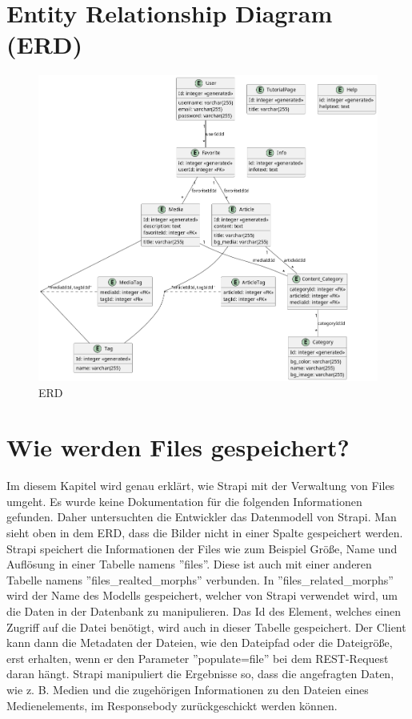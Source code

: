 \section{\textbf{E}ntity \textbf{R}elationship \textbf{D}iagram (ERD)}

\begin{figure}[H]
  \centering
  \includegraphics[height=1\textwidth]{./pics/erd.png}
  \caption{ERD}

\end{figure}

\section{Wie werden Files gespeichert?}
Im diesem Kapitel wird genau erklärt, wie Strapi mit der Verwaltung von Files umgeht. Es wurde keine Dokumentation für
die folgenden Informationen gefunden. Daher untersuchten die Entwickler das Datenmodell von  Strapi.
Man sieht oben in dem ERD,
dass die Bilder nicht in einer Spalte gespeichert werden. Strapi speichert die Informationen der Files wie zum
Beispiel Größe, Name und Auflösung in einer Tabelle namens ''files''.
Diese ist auch mit einer anderen Tabelle namens ''files\_realted\_morphs'' verbunden. In ''files\_related\_morphs'' wird
der Name des Modells gespeichert, welcher von Strapi verwendet wird, um die Daten in der Datenbank zu manipulieren. Das
Id des Element, welches einen Zugriff auf die Datei benötigt, wird auch in dieser Tabelle gespeichert.
Der Client kann dann die Metadaten der Dateien, wie den Dateipfad oder die Dateigröße, erst erhalten, wenn er den Parameter ''populate=file'' bei dem REST-Request daran hängt.
Strapi manipuliert die Ergebnisse so, dass die angefragten Daten, wie z. B. Medien und die zugehörigen Informationen zu den Dateien eines Medienelements, im Responsebody zurückgeschickt werden können.

